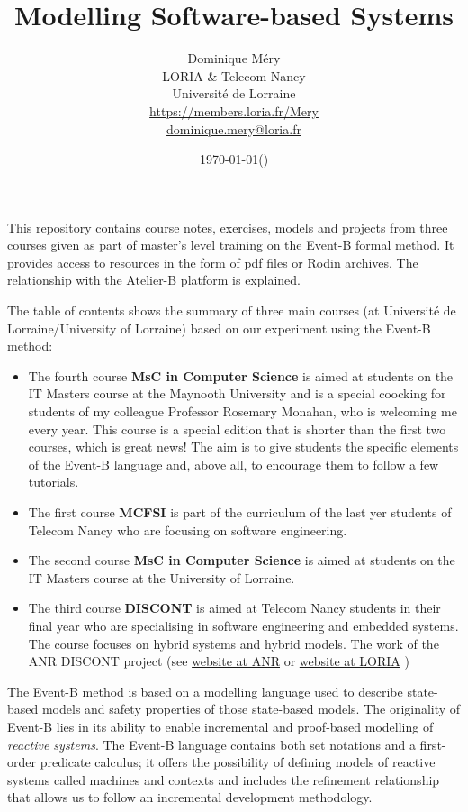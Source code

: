 \documentclass[ 12pt]{article}
\title{Modelling Software-based Systems}
\author{Dominique M\'ery\\
LORIA \& Telecom Nancy\\ Universit\'e de Lorraine\\
\url{https://members.loria.fr/Mery}\\ \url{dominique.mery@loria.fr}}
\date{\today (\now)}
\begin{document}
  \setcounter{ex}{1}
\maketitle

This repository contains course notes, exercises, models and projects
from three courses given as part of master's level training on the
Event-B formal method. It provides access to resources in the form of
pdf files or Rodin archives. The relationship with the Atelier-B
platform is explained.

The table
of contents shows the  summary of three main courses (at Université de 
 Lorraine/University of Lorraine)  based on our
experiment using the  Event-B method:
\begin{itemize}


\item The fourth course  \textbf{MsC in Computer Science} is aimed at students on the IT Masters course 
  at the Maynooth  University   and is a special coocking for students 
  of my colleague Professor Rosemary Monahan, who is welcoming me every 
  year. This course is a special edition that is shorter than the first two courses, which is great news! The aim is to give students the specific elements of the Event-B language and, above all, to encourage them to follow a few tutorials.  

  
\item The first course \textbf{MCFSI} is part of the curriculum of the last yer
  students of Telecom Nancy  who are  focusing on software
  engineering.
\item  The second course  \textbf{MsC in Computer Science} is aimed at students on the IT Masters course
  at the University of Lorraine.
\item  The third course \textbf{DISCONT} is aimed at Telecom Nancy students in their final year who are specialising in software engineering and embedded systems. The course focuses on hybrid systems and hybrid models. The work of the ANR DISCONT project (see 
\href{https://anr.fr/Projet-ANR-17-CE25-0005}{
   website at ANR} or  \href{https://discont.loria.fr}{  website at
   LORIA} )

 \end{itemize}



  The Event-B  method is based on a modelling
 language used to describe state-based models and  safety
 properties of those state-based models.  The originality of  Event-B
 lies in its ability  to
 enable incremental and proof-based modelling of \textit{reactive
   systems}. The  Event-B   language contains both set notations and a
 first-order predicate calculus; it offers the possibility of defining
 models of reactive systems called machines and contexts and includes
  the refinement relationship that allows us to follow an incremental
  development methodology.  
\end{document}
